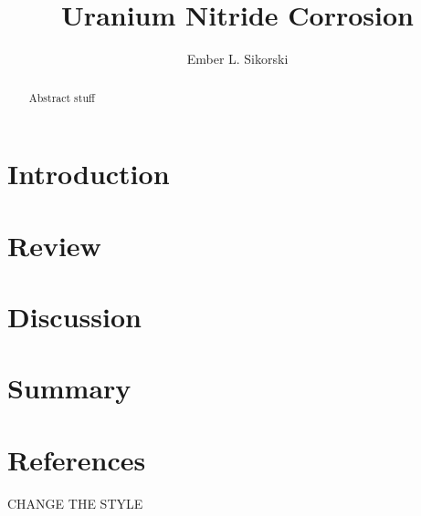 \documentclass[3p,review,11pt]{elsarticle}
\begin{document}
\begin{frontmatter}
	\title{Uranium Nitride Corrosion}
	
	\author[boise]{Ember L. Sikorski}
	
	
	\address[boise]{Boise State University}
	
	\begin{abstract}
Abstract stuff
	\end{abstract}	
	
\end{frontmatter}


\section{Introduction}

\section{Review}



\section{Discussion}



\section{Summary}






\cite{Jolkkonen2017}





\section*{References}
CHANGE THE STYLE



\end{document}
